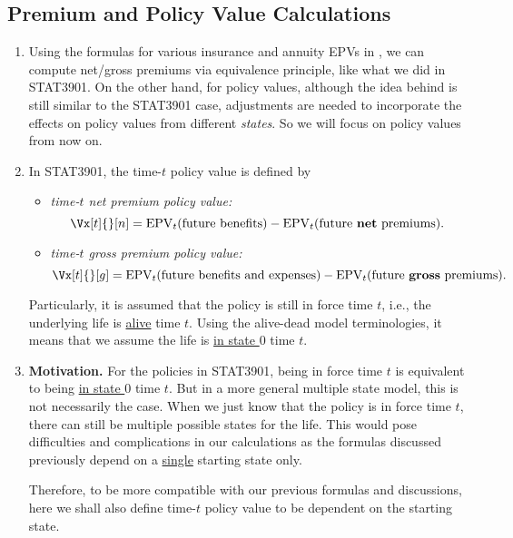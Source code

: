 \subsection{Premium and Policy Value Calculations}
\begin{enumerate}
\item Using the formulas for various insurance and annuity EPVs in
, we can compute net/gross premiums via
equivalence principle, like what we did in STAT3901. On the other hand, for
policy values, although the idea behind is still similar to the STAT3901 case,
adjustments are needed to incorporate the effects on policy values from
different \emph{states}. So we will focus on policy values from now on.

\item In STAT3901, the time-\(t\) policy value is defined by
\begin{itemize}
\item \emph{time-\(t\) net premium policy value:}
\[\Vx[t]{}[n]
=\epvt{t}{\text{future benefits}}-\epvt{t}{\text{future \textbf{net} premiums}}.\]
\item \emph{time-\(t\) gross premium policy value:}
\[\Vx[t]{}[g]
=\epvt{t}{\text{future benefits and expenses}}-\epvt{t}{\text{future \textbf{gross} premiums}}.\]
\end{itemize}
Particularly, it is assumed that the policy is still in force  time
\(t\), i.e., the underlying life is \underline{alive}  time \(t\).
Using the alive-dead model terminologies, it means that we assume the life is
\underline{in state \(0\)}  time \(t\).

\item \textbf{Motivation.} For the policies in STAT3901, being in force
 time \(t\) is equivalent to being \underline{in state \(0\)}
 time \(t\). But in a more general multiple state model, this is not
necessarily the case. When we just know that the policy is in force 
time \(t\), there can still be multiple possible states for the life. This
would pose difficulties and complications in our calculations as the formulas
discussed previously depend on a \underline{single} starting state only.

Therefore, to be more compatible with our previous formulas and discussions,
here we shall also define time-\(t\) policy value to be dependent on the
starting state.


\end{enumerate}
